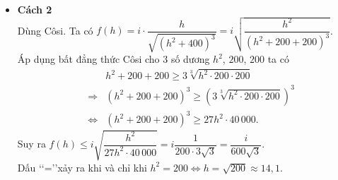 \begin{ex}
{\begin{itemize}
\begin{eqnarray*}
&=& i \cdot \dfrac{\sqrt{\left(h^2+400\right)^3}-\dfrac{3 h^2 \cdot\left(h^2+400\right)^2}{\sqrt{\left(h^2+400\right)^3}}}{\left(h^2+400\right)^3}\\
&=&  i \cdot \dfrac{\left(h^2+400\right)^3-3 h^2 \cdot\left(h^2+400\right)^2}{\left(h^2+400\right)^3 \sqrt{\left(h^2+400\right)^3}}\\
&=& i\cdot \dfrac{400-2 h^2}{\sqrt{\left(h^2+400\right)^5}}.
\end{eqnarray*}
Khi đó $f'(h)=0\Leftrightarrow h=10\sqrt{2}$. Ta có bảng biến thiên
\begin{center}
\end{center}
Từ bảng biến thiên suy ra $\max f(h)$ khi $h=10\sqrt{2}\approx 14{,}1$.
\item \textbf{Cách 2}\\
Dùng Côsi. Ta có
$f(h)=i\cdot \dfrac{h}{\sqrt{\left(h^2+400\right)^3}}=i\sqrt{\dfrac{h^2}{\left(h^2+200+200\right)^3}}$.\\
Áp dụng bất đẳng thức Côsi cho $3$ số dương $h^2$, $200$, $200$ ta có
\begin{eqnarray*}
& &	h^2+200+200\geq 3\sqrt[3]{h^2\cdot 200\cdot 200}\\
&\Rightarrow& \left(h^2+200+200\right)^3\geq \left(3\sqrt[3]{h^2\cdot 200\cdot 200}\right)^3\\
&\Leftrightarrow & \left(h^2+200+200\right)^3\geq 27h^2\cdot 40\, 000.
\end{eqnarray*}
Suy ra $f(h)\leq i\sqrt{\dfrac{h^2}{27h^2\cdot 40\, 000}}=i\dfrac{1}{200\cdot 3\sqrt{3}}=\dfrac{i}{600\sqrt{3}}$.\\
Dấu \lq \lq =\rq \rq xảy ra khi và chỉ khi $h^2=200\Leftrightarrow h=\sqrt{200}\approx 14{,}1$.
\end{itemize}
}
\end{ex}

